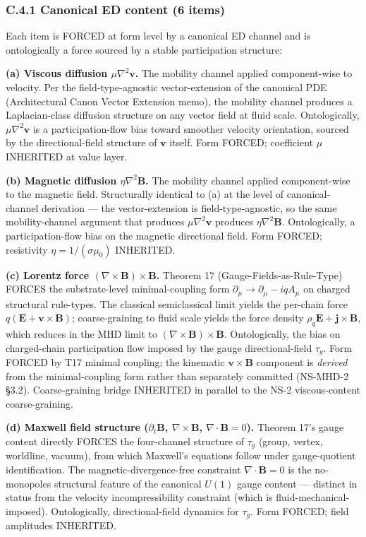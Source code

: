 \documentclass[
  11pt,a4paper]{article}
\begin{document}
\subsubsection{C.4.1 Canonical ED content (6
items)}\label{c.4.1-canonical-ed-content-6-items}

Each item is FORCED at form level by a canonical ED channel and is
ontologically a force sourced by a stable participation structure:

\textbf{(a) Viscous diffusion \(\mu\nabla^2\mathbf{v}\).} The mobility
channel applied component-wise to velocity. Per the field-type-agnostic
vector-extension of the canonical PDE (Architectural Canon Vector
Extension memo), the mobility channel produces a Laplacian-class
diffusion structure on any vector field at fluid scale. Ontologically,
\(\mu\nabla^2\mathbf{v}\) is a participation-flow bias toward smoother
velocity orientation, sourced by the directional-field structure of
\(\mathbf{v}\) itself. Form FORCED; coefficient \(\mu\) INHERITED at
value layer.

\textbf{(b) Magnetic diffusion \(\eta\nabla^2\mathbf{B}\).} The mobility
channel applied component-wise to the magnetic field. Structurally
identical to (a) at the level of canonical-channel derivation --- the
vector-extension is field-type-agnostic, so the same mobility-channel
argument that produces \(\mu\nabla^2\mathbf{v}\) produces
\(\eta\nabla^2\mathbf{B}\). Ontologically, a participation-flow bias on
the magnetic directional field. Form FORCED; resistivity
\(\eta = 1/(\sigma\mu_0)\) INHERITED.

\textbf{(c) Lorentz force \((\nabla\times\mathbf{B})\times\mathbf{B}\).}
Theorem 17 (Gauge-Fields-as-Rule-Type) FORCES the substrate-level
minimal-coupling form \(\partial_\mu \to \partial_\mu - iqA_\mu\) on
charged structural rule-types. The classical semiclassical limit yields
the per-chain force \(q(\mathbf{E} + \mathbf{v}\times\mathbf{B})\);
coarse-graining to fluid scale yields the force density
\(\rho_q\mathbf{E} + \mathbf{j}\times\mathbf{B}\), which reduces in the
MHD limit to \((\nabla\times\mathbf{B})\times\mathbf{B}\).
Ontologically, the bias on charged-chain participation flow imposed by
the gauge directional-field \(\tau_g\). Form FORCED by T17 minimal
coupling; the kinematic \(\mathbf{v}\times\mathbf{B}\) component is
\emph{derived} from the minimal-coupling form rather than separately
committed (NS-MHD-2 §3.2). Coarse-graining bridge INHERITED in parallel
to the NS-2 viscous-content coarse-graining.

\textbf{(d) Maxwell field structure (\(\partial_t\mathbf{B}\),
\(\nabla\times\mathbf{B}\), \(\nabla\cdot\mathbf{B} = 0\)).} Theorem
17's gauge content directly FORCES the four-channel structure of
\(\tau_g\) (group, vertex, worldline, vacuum), from which Maxwell's
equations follow under gauge-quotient identification. The
magnetic-divergence-free constraint \(\nabla\cdot\mathbf{B} = 0\) is the
no-monopoles structural feature of the canonical \(U(1)\) gauge content
--- distinct in status from the velocity incompressibility constraint
(which is fluid-mechanical-imposed). Ontologically, directional-field
dynamics for \(\tau_g\). Form FORCED; field amplitudes INHERITED.
\end{document}
